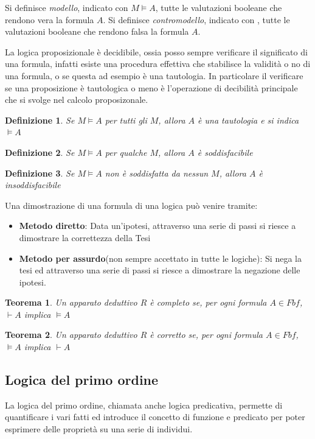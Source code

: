 \documentclass[a4paper]{report}
\newtheorem{defi}{Definizione}%
\newtheorem{teorema}{Teorema}[chapter]
\begin{document}
Si definisce \emph{modello}, indicato con $M \models A$, tutte le valutazioni booleane
che rendono vera la formula $A$.
Si definisce \emph{contromodello}, indicato con , tutte le valutazioni booleane
che rendono falsa la formula $A$.

La logica proposizionale è decidibile, ossia posso sempre verificare il significato di una formula, infatti esiste
una procedura effettiva che stabilisce la validità o no di una formula, o se questa ad esempio è una tautologia.
In particolare il verificare se una proposizione è tautologica o meno è l’operazione di decibilità principale che si svolge
nel calcolo proposizonale.

\begin{defi}
    Se $M \models A$ per tutti gli $M$, allora $A$ è una tautologia e si indica $\models A$
\end{defi}

\begin{defi}
    Se $M \models A$ per qualche $M$, allora $A$ è soddisfacibile
\end{defi}

\begin{defi}
Se $M \models A$ non è soddisfatta da nessun $M$, allora $A$ è insoddisfacibile
\end{defi}

Una dimostrazione di una formula di una logica può venire tramite:
\begin{itemize}
  \item  \textbf{Metodo diretto}: Data un'ipotesi, attraverso una serie di passi
          si riesce a dimostrare la correttezza della Tesi
  \item \textbf{Metodo per assurdo}(non sempre accettato in tutte le logiche):
        Si nega la tesi ed attraverso una serie di passi si riesce a dimostrare
        la negazione delle ipotesi.
\end{itemize}

\begin{teorema}
    Un apparato deduttivo $R$ è completo se, per ogni formula $A \in Fbf$, $\vdash A$
    implica $\models A$
\end{teorema}

\begin{teorema}
    Un apparato deduttivo $R$ è corretto se, per ogni formula $A \in Fbf$, $\models A$
    implica $\vdash A$
\end{teorema}

\subsection{Logica del primo ordine}
La logica del primo ordine, chiamata anche logica predicativa, permette di quantificare i vari fatti ed introduce il concetto di funzione e
predicato per poter esprimere delle proprietà su una serie di individui.
\end{document}
